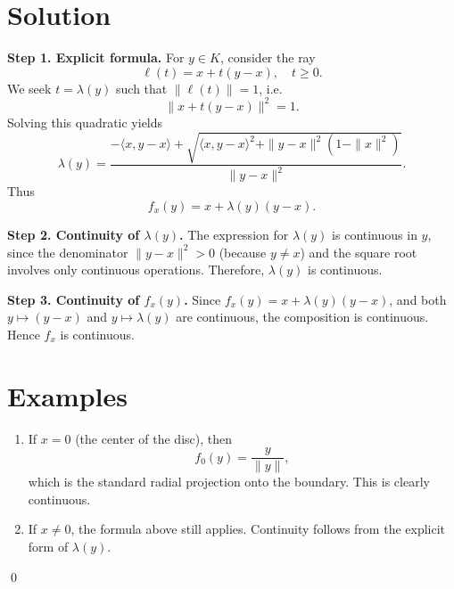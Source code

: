 \documentclass[11pt,a4paper]{article}
\theoremstyle{definition}
\theoremstyle{definition}
\theoremstyle{plain}
\theoremstyle{remark}
\begin{document}
\section*{Solution}
\textbf{Step 1. Explicit formula.}  
For $y\in K$, consider the ray
\[
\ell(t) = x + t(y-x), \quad t\geq 0.
\]
We seek $t=\lambda(y)$ such that $\|\ell(t)\|=1$, i.e.
\[
\|x + t(y-x)\|^2 = 1.
\]
Solving this quadratic yields
\[
\lambda(y) = \frac{-\langle x, y-x \rangle + \sqrt{\langle x,y-x\rangle^2 + \|y-x\|^2(1-\|x\|^2)}}{\|y-x\|^2}.
\]
Thus
\[
f_x(y) = x + \lambda(y)(y-x).
\]

\medskip

\textbf{Step 2. Continuity of $\lambda(y)$.}  
The expression for $\lambda(y)$ is continuous in $y$, since the denominator $\|y-x\|^2>0$ (because $y\neq x$) and the square root involves only continuous operations. Therefore, $\lambda(y)$ is continuous.

\medskip

\textbf{Step 3. Continuity of $f_x(y)$.}  
Since $f_x(y) = x + \lambda(y)(y-x)$, and both $y\mapsto (y-x)$ and $y\mapsto \lambda(y)$ are continuous, the composition is continuous. Hence $f_x$ is continuous.

\medskip

\section*{Examples}
\begin{enumerate}
	\item If $x=0$ (the center of the disc), then
	\[
	f_0(y) = \frac{y}{\|y\|},
	\]
	which is the standard radial projection onto the boundary. This is clearly continuous.
	\item If $x\neq 0$, the formula above still applies. Continuity follows from the explicit form of $\lambda(y)$.
\end{enumerate}
\qed
\end{document}
